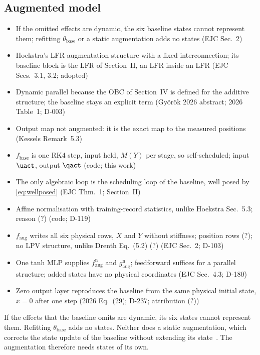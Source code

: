 \subsection{Augmented model}\label{sec:aug_structure}
\ifdraft
\begin{itemize}
\item If the omitted effects are dynamic, the six baseline states cannot represent them; refitting $\theta_{\mathrm{base}}$ or a static augmentation adds no states (EJC Sec.~2)
\item Hoekstra's LFR augmentation structure with a fixed interconnection; its baseline block is the LFR of Section~II, an LFR inside an LFR (EJC Secs.~3.1, 3.2; adopted)
\item Dynamic parallel because the OBC of Section~IV is defined for the additive structure; the baseline stays an explicit term (Gy\"or\"ok 2026 abstract; 2026 Table~1; D-003)
\item Output map not augmented: it is the exact map to the measured positions (Kessels Remark~5.3)
\item $f_{\mathrm{base}}$ is one RK4 step, input held, $M(Y)$ per stage, so self-scheduled; input $\uact$, output $\qact$ (code; this work)
\item The only algebraic loop is the scheduling loop of the baseline, well posed by \eqref{eq:wellposed} (EJC Thm.~1; Section~II)
\item Affine normalisation with training-record statistics, unlike Hoekstra Sec.~5.3; reason (?) (code; D-119)
\item $f_{\mathrm{aug}}$ writes all six physical rows, $X$ and $Y$ without stiffness; position rows (?); no LPV structure, unlike Drenth Eq.~(5.2) (?) (EJC Sec.~2; D-103)
\item One tanh MLP supplies $f^{\mathrm n}_{\mathrm{aug}}$ and $g^{\mathrm n}_{\mathrm{aug}}$; feedforward suffices for a parallel structure; added states have no physical coordinates (EJC Sec.~4.3; D-180)
\item Zero output layer reproduces the baseline from the same physical initial state, $\bar x=0$ after one step (2026 Eq.~(29); D-237; attribution (?))
\end{itemize}
\fi

If the effects that the baseline omits are dynamic, its six states cannot
represent them.
Refitting $\theta_{\mathrm{base}}$ adds no states.
Neither does a static augmentation, which corrects the state update of the
baseline without extending its state~\cite[Sec.~2]{hoekstra2025lfr}.
The augmentation therefore needs states of its own.

